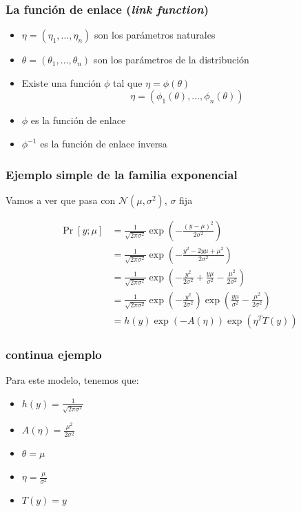 \documentclass{beamer}
\begin{document}
\begin{frame}
  \frametitle{La función de enlace (\emph{link function})}

  \begin{itemize}
    \item $\eta = (\eta_1, \ldots, \eta_n)$ son los parámetros naturales
    \item $\theta = (\theta_1, \ldots, \theta_n)$ son los parámetros de la distribución
    \item Existe una función $\phi$ tal que $\eta = \phi(\theta)$
    $$\eta = (\phi_1(\theta), \ldots, \phi_n(\theta))$$
    \item $\phi$ es la función de enlace
    \item $\phi^{-1}$ es la función de enlace inversa
  \end{itemize}
\end{frame}

\begin{frame}
  \frametitle{Ejemplo simple de la familia exponencial}

  Vamos a ver que pasa con $\mathcal{N}(\mu, \sigma^2)$, $\sigma$ fija
  
  \begin{align*}
    \Pr[y; \mu] &= \frac{1}{\sqrt{2 \pi \sigma^2}} \exp\left(-\frac{(y - \mu)^2}{2 \sigma^2}\right) \\
      &= \frac{1}{\sqrt{2 \pi \sigma^2}} \exp\left(-\frac{y^2 - 2 y \mu + \mu^2}{2 \sigma^2}\right) \\
      &= \frac{1}{\sqrt{2 \pi \sigma^2}} \exp\left(-\frac{y^2}{2 \sigma^2} + \frac{y \mu}{\sigma^2} - \frac{\mu^2}{2 \sigma^2}\right) \\
      &= \frac{1}{\sqrt{2 \pi \sigma^2}} \exp\left(-\frac{y^2}{2 \sigma^2}\right) \exp\left(\frac{y \mu}{\sigma^2} - \frac{\mu^2}{2 \sigma^2}\right) \\
      &= h(y) \exp(-A(\eta)) \exp(\eta^T T(y))
  \end{align*}  
\end{frame}

\begin{frame}
  \frametitle{continua ejemplo}

  Para este modelo, tenemos que:
  \begin{itemize}
    \item $h(y) = \frac{1}{\sqrt{2 \pi \sigma^2}}$
    \item $A(\eta) = \frac{\mu^2}{2 \sigma^2}$
    \item $\theta = \mu$
    \item $\eta = \frac{\mu}{\sigma^2}$
    \item $T(y) = y$
  \end{itemize}
  
\end{frame}
\end{document}
